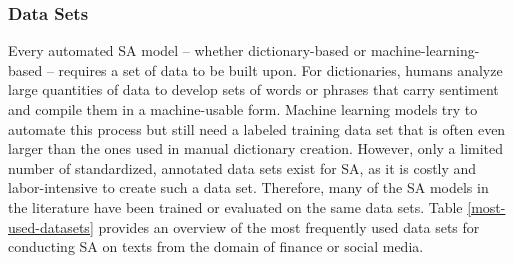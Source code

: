 \subsubsection{Data Sets}

Every automated SA model -- whether dictionary-based or machine-learning-based -- requires a set of data to be built upon. For dictionaries, humans analyze large quantities of data to develop sets of words or phrases that carry sentiment and compile them in a machine-usable form. Machine learning models try to automate this process but still need a labeled training data set that is often even larger than the ones used in manual dictionary creation. However, only a limited number of standardized, annotated data sets exist for SA, as it is costly and labor-intensive to create such a data set. Therefore, many of the SA models in the literature have been trained or evaluated on the same data sets. Table \ref{most-used-datasets} provides an overview of the most frequently used data sets for conducting SA on texts from the domain of finance or social media.



